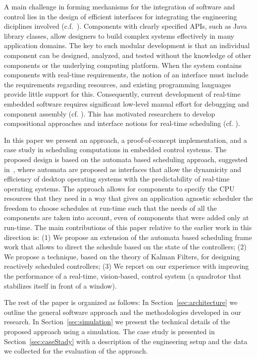 \documentclass{sig-alternate-ipsn13}
\begin{document}
A main challenge in forming mechanisms for the integration of software and control lies in the design of efficient interfaces for integrating the engineering diciplines involved (c.f.~\cite{weiss2007automata}). Components with clearly specified APIs, such as Java library classes, allow designers to build
complex systems effectively in many application domains.  The key to such modular development is
that an individual component can be designed, analyzed, and tested without the knowledge of other
components or the underlying computing platform. When the system contains components with
real-time requirements, the notion of an interface must include the requirements regarding
resources, and existing programming languages provide little support for this.  Consequently,
current development of real-time embedded software requires significant low-level manual effort for
debugging and component assembly (cf.  \cite{Lee00,IEEE03,HS06}).  This has motivated 
researchers to develop compositional approaches and interface notions for real-time scheduling (cf.
\cite{RS01,dH01,MF01,CAHS03,SL08,SLBS04,TWS06,DBLP:conf/lctrts/AuerbachBIKRRT07}).


In this paper we present an approach, a proof-of-concept implementation, and a case study in scheduling computations in embedded control systems. The proposed design is based on the automata based scheduling approach, suggested in~\cite{WA07,RTComposer,AW08}, where automata are proposed as interfaces that allow the dynamicity and efficiency of desktop operating systems with the predictability of real-time operating systems. The approach allows for components to specify the CPU resources that they need in a way that gives an application agnostic scheduler the freedom to choose schedules at run-time such that the needs of all the components are taken into account, even of components that were added only at run-time.  The main contributions of this paper relative to the earlier work in this direction is:
(1) We propose an extension of the automata based scheduling frame work that allows to direct the schedule based on the state of the controllers; (2) We propose a technique, based on the theory of Kalman Filters, for designing reactively scheduled controllers; (3) We report on our experience with improving the performance of a real-time, vision-based, control system (a quadrotor that stabilizes itself in front of a window).

The rest of the paper is organized as follows: In Section~\ref{sec:architecture} we outline the general software approach and the methodologies developed in our research. In Section~\ref{sec:simulation} we present the technical details of the proposed approach using a simulation. The case study is presented in Section~\ref{sec:caseStady} with a description of the engineering setup and the data we collected for the evaluation of the approach.
\end{document}
